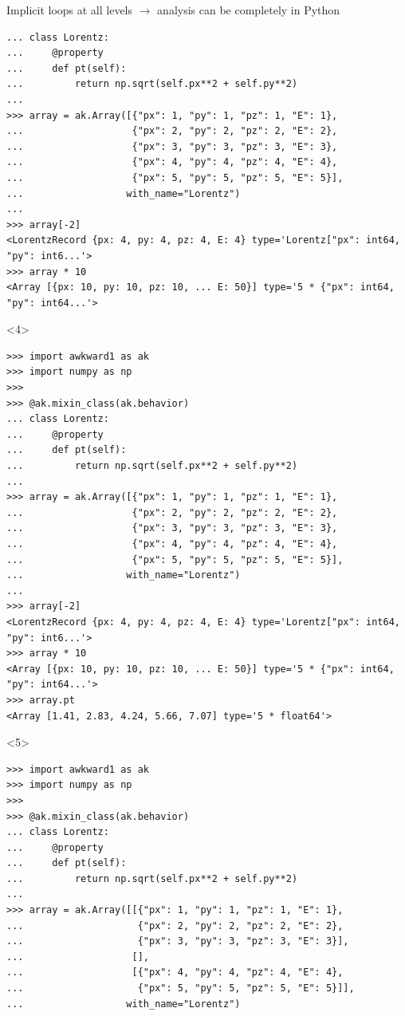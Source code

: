 \documentclass[aspectratio=169]{beamer}
\begin{document}
\begin{frame}[fragile]{Implicit loops at all levels $\to$ analysis can be completely in Python}
\begin{onlyenv}
\begin{verbatim}
... class Lorentz:
...     @property
...     def pt(self):
...         return np.sqrt(self.px**2 + self.py**2)
... 
>>> array = ak.Array([{"px": 1, "py": 1, "pz": 1, "E": 1},
...                   {"px": 2, "py": 2, "pz": 2, "E": 2},
...                   {"px": 3, "py": 3, "pz": 3, "E": 3},
...                   {"px": 4, "py": 4, "pz": 4, "E": 4},
...                   {"px": 5, "py": 5, "pz": 5, "E": 5}],
...                  with_name="Lorentz")
... 
>>> array[-2]
<LorentzRecord {px: 4, py: 4, pz: 4, E: 4} type='Lorentz["px": int64, "py": int6...'>
>>> array * 10
<Array [{px: 10, py: 10, pz: 10, ... E: 50}] type='5 * {"px": int64, "py": int64...'>
\end{verbatim}
\vspace{3 cm}
\end{onlyenv}
\begin{onlyenv}<4>
\begin{verbatim}
>>> import awkward1 as ak
>>> import numpy as np
>>> 
>>> @ak.mixin_class(ak.behavior)
... class Lorentz:
...     @property
...     def pt(self):
...         return np.sqrt(self.px**2 + self.py**2)
... 
>>> array = ak.Array([{"px": 1, "py": 1, "pz": 1, "E": 1},
...                   {"px": 2, "py": 2, "pz": 2, "E": 2},
...                   {"px": 3, "py": 3, "pz": 3, "E": 3},
...                   {"px": 4, "py": 4, "pz": 4, "E": 4},
...                   {"px": 5, "py": 5, "pz": 5, "E": 5}],
...                  with_name="Lorentz")
... 
>>> array[-2]
<LorentzRecord {px: 4, py: 4, pz: 4, E: 4} type='Lorentz["px": int64, "py": int6...'>
>>> array * 10
<Array [{px: 10, py: 10, pz: 10, ... E: 50}] type='5 * {"px": int64, "py": int64...'>
>>> array.pt
<Array [1.41, 2.83, 4.24, 5.66, 7.07] type='5 * float64'>
\end{verbatim}
\vspace{3 cm}
\end{onlyenv}
\begin{onlyenv}<5>
\begin{verbatim}
>>> import awkward1 as ak
>>> import numpy as np
>>> 
>>> @ak.mixin_class(ak.behavior)
... class Lorentz:
...     @property
...     def pt(self):
...         return np.sqrt(self.px**2 + self.py**2)
... 
>>> array = ak.Array([[{"px": 1, "py": 1, "pz": 1, "E": 1},
...                    {"px": 2, "py": 2, "pz": 2, "E": 2},
...                    {"px": 3, "py": 3, "pz": 3, "E": 3}],
...                   [],
...                   [{"px": 4, "py": 4, "pz": 4, "E": 4},
...                    {"px": 5, "py": 5, "pz": 5, "E": 5}]],
...                  with_name="Lorentz")

\end{verbatim}
\end{onlyenv}
\end{frame}
\end{document}
